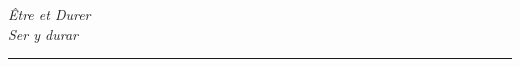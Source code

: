 \chapter*{} %

\begin{flushright}
    \textit{Être et Durer} \\
    \textit{Ser y durar} \\
    \rule{5cm}{0.5pt} 
\end{flushright}

